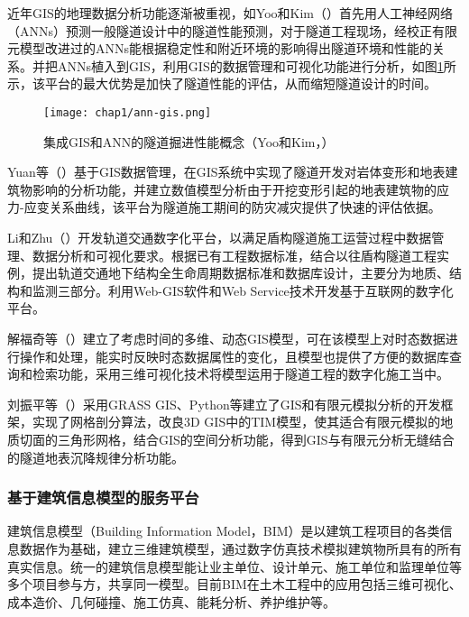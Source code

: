 近年GIS的地理数据分析功能逐渐被重视，如Yoo和Kim（\citeyear{yoo2007tunneling}）首先用人工神经网络（ANNs）预测一般隧道设计中的隧道性能预测，对于隧道工程现场，经校正有限元模型改进过的ANNs能根据稳定性和附近环境的影响得出隧道环境和性能的关系。并把ANNs植入到GIS，利用GIS的数据管理和可视化功能进行分析，如图\ref{fig:集成GIS和ANN的隧道掘进性能概念}所示，该平台的最大优势是加快了隧道性能的评估，从而缩短隧道设计的时间。

\begin{figure}[!h]
	\centering
	\texttt{[image: chap1/ann-gis.png]}
	\caption{集成GIS和ANN的隧道掘进性能概念（Yoo和Kim，\citeyear{yoo2007tunneling}）}
	\label{fig:集成GIS和ANN的隧道掘进性能概念}
\end{figure}

Yuan等（\citeyear{yuan2012study}）基于GIS数据管理，在GIS系统中实现了隧道开发对岩体变形和地表建筑物影响的分析功能，并建立数值模型分析由于开挖变形引起的地表建筑物的应力-应变关系曲线，该平台为隧道施工期间的防灾减灾提供了快速的评估依据。

Li和Zhu（\citeyear{li2013development}）开发轨道交通数字化平台，以满足盾构隧道施工运营过程中数据管理、数据分析和可视化要求。根据已有工程数据标准，结合以往盾构隧道工程实例，提出轨道交通地下结构全生命周期数据标准和数据库设计，主要分为地质、结构和监测三部分。利用Web-GIS软件和Web Service技术开发基于互联网的数字化平台。

解福奇等（\citeyear{解福奇2009时态}）建立了考虑时间的多维、动态GIS模型，可在该模型上对时态数据进行操作和处理，能实时反映时态数据属性的变化，且模型也提供了方便的数据库查询和检索功能，采用三维可视化技术将模型运用于隧道工程的数字化施工当中。

刘振平等（\citeyear{刘振平20173d}）采用GRASS GIS、Python等建立了GIS和有限元模拟分析的开发框架，实现了网格剖分算法，改良3D GIS中的TIM模型，使其适合有限元模拟的地质切面的三角形网格，结合GIS的空间分析功能，得到GIS与有限元分析无缝结合的隧道地表沉降规律分析功能。

\subsubsection{基于建筑信息模型的服务平台}

建筑信息模型（Building Information Model，BIM）是以建筑工程项目的各类信息数据作为基础，建立三维建筑模型，通过数字仿真技术模拟建筑物所具有的所有真实信息。统一的建筑信息模型能让业主单位、设计单元、施工单位和监理单位等多个项目参与方，共享同一模型。目前BIM在土木工程中的应用包括三维可视化、成本造价、几何碰撞、施工仿真、能耗分析、养护维护等。


